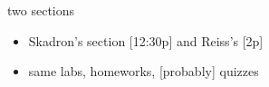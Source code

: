 \begin{frame}{two sections}
    \begin{itemize}
    \item Skadron's section [12:30p] and Reiss's [2p]
    \item same labs, homeworks, [probably] quizzes
    \end{itemize}
\end{frame}
